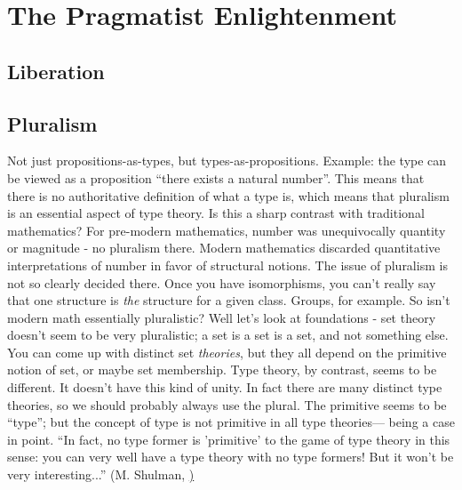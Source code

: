 \section{The Pragmatist Enlightenment}
\label{sect:enlightenment}

\subsection{Liberation}
\label{subs:liberation}



\subsection{Pluralism}
\label{subs:pluralism}

\begin{ednote}
  Not just propositions-as-types, but types-as-propositions.  Example:
  the type \N can be viewed as a proposition ``there exists a natural
  number''.  This means that there is no authoritative definition of
  what a type is, which means that pluralism is an essential aspect of
  type theory.  Is this a sharp contrast with traditional mathematics?
  For pre-modern mathematics, number was unequivocally quantity or
  magnitude - no pluralism there.  Modern mathematics discarded
  quantitative interpretations of number in favor of structural
  notions.  The issue of pluralism is not so clearly decided there.
  Once you have isomorphisms, you can't really say that one structure
  is \emph{the} structure for a given class.  Groups, for example.  So
  isn't modern math essentially pluralistic?  Well let's look at
  foundations - set theory doesn't seem to be very pluralistic; a set
  is a set is a set, and not something else.  You can come up with
  distinct set \emph{theories}, but they all depend on the primitive
  notion of set, or maybe set membership.  Type theory, by contrast,
  seems to be different.  It doesn't have this kind of unity.  In fact
  there are many distinct type theories, so we should probably always
  use the plural.  The primitive seems to be ``type''; but the concept
  of type is not primitive in all type theories---\HoTT{} being a case
  in point.  ``In fact, no type former is 'primitive' to the game of
  type theory in this sense: you can very well have a type theory with
  no type formers! But it won't be very interesting...'' (M. Shulman,
  \href{https://groups.google.com/d/msg/hott-amateurs/U1X0m4r6G-A/K5eeMSPXE5YJ})
\end{ednote}

